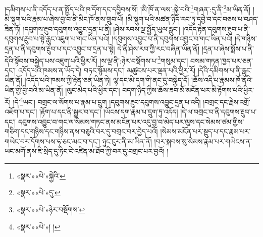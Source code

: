 །དམིགས་པ་ནི་འདོད་པ་ན་སྤྱོད་པའི་ཁ་དོག་དང་དབྱིབས་སོ། །མི་ཁོ་ན་ལས་:སྐྱེ་བའི་\footnote{«སྣར་»«པེ་»སྐྱེའི་}གཞན་:དུ་ནི་\footnote{«སྣར་»«པེ་»དུ་}མ་ཡིན་ནོ། །མི་སྡུག་པའི་རྣམ་པ་ཞེས་བྱ་བ་ནི་མིང་ཁོ་ནས་གྲུབ་པོ། །མི་སྡུག་པའི་མཚན་ཉིད་རབ་ཏུ་དབྱེ་བ་དང་བཅས་པ་བཤད་ཟིན་ཏོ། །དབུགས་རྔུབ་དབུགས་འབྱུང་དྲན་པ་ནི། །ཤེས་རབས་ལྔ་སྤྱོད་ཡུལ་རླུང་། །འདོད་རྟེན་དབུགས་རྔུབ་པ་ནི་དབུགས་རྔུབ་པ་སྟེ་རླུང་འཇུག་པ་གང་ཡིན་པའོ། །དབུགས་འབྱུང་བ་ནི་དབུགས་འབྱུང་བ་གང་ཡིན་པའོ། །དེ་གཉིས་དྲན་པ་ནི་དབུགས་རྔུབ་པ་དང་འབྱུང་བ་དྲན་པ་སྟེ། དེ་ནི་ཤེས་རབ་ཀྱི་རང་བཞིན་ཡིན་ནོ། །དྲན་པ་ཞེས་སྨོས་པ་ནི་དེའི་སྟོབས་བསྐྱེད་པས་འཇུག་པའི་ཕྱིར་རོ། །ས་ལྔ་ནི་:ཉེར་བསྡོགས་པ་\footnote{«སྣར་»«པེ་»ཉེར་བསྡོགས་}གསུམ་དང་། བསམ་གཏན་ཁྱད་པར་ཅན་དང་། འདོད་པའི་ཁམས་ན་ཡོད་དེ། བཏང་སྙོམས་དང་། མཚུངས་པར་ལྡན་པའི་ཕྱིར་རོ། །དེའི་དམིགས་པ་ནི་རླུང་ཡིན་ནོ། །འདོད་པའི་ཁམས་ཀྱི་རྟེན་ཅན་ཡིན་ཏེ། ལྷ་དང་མི་དག་གི་ནང་དུ་བསྐྱེད་དོ། །ཆོས་འདི་པ་རྣམས་ཁོ་ནའི་ཡིན་གྱི་བྱི་བའི་མ་ཡིན་ནོ། །ལུང་མེད་པའི་ཕྱིར་དང་། བདག་ཉིད་ཀྱིས་ཆོས་ཟབ་མོ་མངོན་པར་མི་རྟོགས་པའི་ཕྱིར་རོ། །དེ་\footnote{«སྣར་»«པེ་»། །}ཡང་། བགྲང་ལ་སོགས་པ་རྣམ་པ་དྲུག །དབུགས་རྔུབ་དབུགས་འབྱུང་དྲན་པ་འདི། །བགྲང་དང་རྗེས་འགྲོ་འཇོག་པ་དང་། །རྟོག་པ་དང་ནི་སྒྱུར་བ་དང་། །ཡོངས་དག་རྣམ་པ་དྲུག་ཏུ་འདོད། །དེ་ལ་བགྲང་བ་ནི་དབུགས་རྔུབ་པ་དང་། དབུགས་འབྱུང་བ་གང་ལ་སེམས་གཏང་ནས་མངོན་པར་འདུ་བྱ་བ་མེད་པར་ལུས་དང་སེམས་ཙམ་གྱིས་གཅིག་དང་གཉིས་དང་གཉིས་ནས་བཅུའི་བར་དུ་བགྲང་བར་བྱེད་པའོ། །སེམས་མངོན་པར་སྡུད་པ་དང་རྣམ་པར་གཡེང་བར་དོགས་པས་ཧ་ཅང་མང་བ་དང་། ཉུང་ངུར་ནི་མ་ཡིན་ནོ། །བར་སྐབས་སུ་སེམས་རྣམ་པར་གཡེངས་ན་ཡང་མགོ་ནས་ཇི་སྲིད་དུ་ཏིང་ངེ་འཛིན་མ་ཐོབ་ཀྱི་བར་དུ་བགྲང་པར་བྱའོ། །
